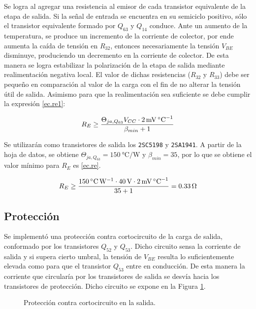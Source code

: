 	Se logra al agregar una resistencia al emisor de cada transistor equivalente de la etapa de salida. Si la señal de entrada se encuentra en su semiciclo positivo, sólo el transistor equivalente formado por $Q_{63}$ y $Q_{14}$ conduce. Ante un aumento de la temperatura, se produce un incremento de la corriente de colector, por ende aumenta la caída de tensión en $R_{32}$, entonces necesariamente la tensión $V_{BE}$ disminuye, produciendo un decremento en la corriente de colector. De esta manera se logra estabilizar la polarización de la etapa de salida mediante realimentación negativa local. El valor de dichas resistencias ($R_{32}$ y $R_{33}$) debe ser pequeño en comparación al valor de la carga con el fin de no alterar la tensión útil de salida. Asimismo para que la realimentación sea suficiente se debe cumplir la expresión \eqref{ec.re1}:

\begin{equation}
	\centering
	R_E \geq \frac{\Theta_{ja,Q_{63}} V_{CC} \cdot \SI{2}{\milli\volt\per\celsius}}{\beta_{min} + 1}
	\label{ec.re1}
\end{equation}
	
	Se utilizarán como transistores de salida los \texttt{2SC5198} y \texttt{2SA1941}. A partir de la hoja de datos, se obtiene $\Theta_{ja,Q_{63}} = \SI{150}{\celsius\per\watt}$ y $\beta_{min} = 35$, por lo que se obtiene el valor mínimo para $R_E$ es \eqref{ec.re}.

	\begin{equation}
		\centering
		R_E \geq \frac{ \SI{150}{\celsius\per\watt} \cdot \SI{40}{\volt} \cdot \SI{2}{\milli\volt\per\celsius} }{ 35 + 1 } = \SI{0.33}{\ohm}
		\label{ec.re}
	\end{equation}



	\subsection{Protección}
	Se implementó una protección contra cortocircuito de la carga de salida, conformado por los transistores $Q_{52}$ y $Q_{53}$. Dicho circuito sensa la corriente de salida y si supera cierto umbral, la tensión de $V_{BE}$ resulta lo suficientemente elevada como para que el transistor $Q_{53}$ entre en conducción. De esta manera la corriente que circularía por los transistores de salida se desvía hacia los transistores de protección.
	Dicho circuito se expone en la Figura \ref{fig.proteccion}.
%
	\begin{figure}[H]
		\centering
		\scalebox{0.5}{}
		\caption{Protección contra cortocircuito en la salida.}
		\label{fig.proteccion}
	\end{figure}


